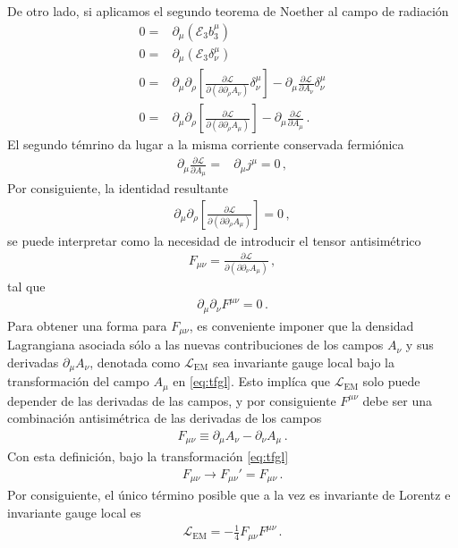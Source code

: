 De otro lado, si aplicamos el segundo teorema de Noether al campo de radiación
\begin{align}
  0=&\partial_{\mu} \left( \mathcal{E}_3 b^{\mu}_3 \right) \nonumber\\
   0=&\partial_{\mu} \left( \mathcal{E}_3 \delta^{\mu}_\nu \right) \nonumber\\
   0=&
 \partial_{\mu} \partial_{\rho} \left[ \frac{\partial \mathcal{L}}{\partial \left(\partial  \partial_{\rho} A_{\nu}\right)}  \delta^{\mu}_\nu \right] - \partial_{\mu} \frac{\partial \mathcal{L}}{\partial A_{\nu}}\delta^{\mu}_{\nu} \nonumber\\
   0=&
 \partial_{\mu} \partial_{\rho}\left[ \frac{\partial \mathcal{L}}{\partial \left(\partial  \partial_{\rho} A_{\mu}\right)}  \right] - \partial_{\mu} \frac{\partial \mathcal{L}}{\partial A_{\mu}} \,.
\end{align}
El segundo témrino da lugar a la misma corriente conservada fermiónica
\begin{align}
  \partial_{\mu} \frac{\partial \mathcal{L}}{\partial A_{\mu}}=&
\partial_{\mu} j^{\mu}=0\,,
\end{align}
Por consiguiente, la identidad resultante
\begin{align}
   \partial_{\mu} \partial_{\rho}\left[ \frac{\partial \mathcal{L}}{\partial \left(\partial  \partial_{\rho} A_{\mu}\right)}  \right]=0\,,
\end{align}
se puede interpretar como la necesidad de introducir el tensor antisimétrico
\begin{align}
  F_{\mu\nu}=\frac{\partial \mathcal{L}}{\partial \left(\partial  \partial_{\nu} A_{\mu}\right)}\,,
\end{align}
tal que
\begin{align}
  \partial_{\mu}\partial_{\nu}F^{\mu\nu}=0\,.
\end{align}
Para obtener una forma para $F_{\mu\nu}$, es conveniente imponer que la densidad Lagrangiana asociada sólo a las nuevas contribuciones de los campos $A_{\nu}$ y sus derivadas $\partial_{\mu}A_{\nu}$, denotada como $\mathcal{L}_{\text{EM}}$ 
sea invariante gauge local bajo la transformación del campo $A_{\mu}$ en \eqref{eq:tfgl}. Esto implíca que $\mathcal{L}_{\text{EM}}$  solo puede depender de las derivadas de las campos, y por consiguiente $F^{\mu\nu}$ debe ser una combinación antisimétrica de las derivadas de los campos
\begin{align}
  F_{\mu\nu}\equiv\partial_{\mu}A_{\nu}-\partial_{\nu}A_{\mu}\,.
\end{align}
Con esta definición, bajo la transformación  \eqref{eq:tfgl}
\begin{align}
  F_{\mu\nu}\to F_{\mu\nu}'=F_{\mu\nu}\,.
\end{align}
Por consiguiente, el único término posible que a la vez es invariante de Lorentz e invariante gauge local es
\begin{align}
  \mathcal{L}_{\text{EM}}=-\frac{1}{4}F_{\mu\nu}F^{\mu\nu}\,.
\end{align}

